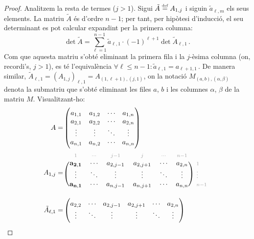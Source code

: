 \begin{s-lema}
\begin{proof}
		Analitzem la resta de termes ($j>1$). Sigui $\tilde{A} \stackrel{\text{\tiny def}}{=} A_{1,j}$ i siguin $\tilde{a}_{\ell,m}$ els seus elements. La matriu $\tilde{A}$ és d'ordre $n-1$; per tant, per hipòtesi d'inducció, el seu determinant es pot calcular expandint per la primera columna: 
		\begin{equation}\label{eq:subdet}
		\det \tilde{A} = \sum_{\ell=1}^{n-1}\tilde{a}_{\ell,1}\cdot (-1)^{\ell+1}\det \tilde{A}_{\ell,1}\,. 
		\end{equation} 
		Com que aquesta matriu s'obté eliminant la primera fila i la $j$-èsima columna (on, recordi's, $j>1$), es té l'equivalència $\forall \ell \le n-1 : {\tilde{a}_{\ell,1} = a_{\ell+1,1}}\,$. De manera similar, $\tilde{A}_{\ell,1} = (A_{1,j})_{\ell,1}= A_{(1,\ell+1),(j,1)}$, on la notació $M_{(a,b),(\alpha,\beta)}$ denota la submatriu que s'obté eliminant les files $a$, $b$ i les columnes $\alpha$, $\beta$ de la matriu $M$. Visualitzant-ho:
		\begin{equation*}
		\begin{split}
		A =&
		\begin{pmatrix}
		a_{1,1}&	a_{1,2}&	\cdots&		a_{1,n}\\
		a_{2,1}&	a_{2,2}&	\cdots&		a_{2,n}\\
		\vdots&		\vdots&		\ddots&		\vdots\\
		a_{n,1}&	a_{n,2}&	\cdots&		a_{n,n}
		\end{pmatrix}\\
		A_{1,j} =&\
		\begin{blockarray}{rcccccc}
		\begin{block}{*{7}{>{\scriptstyle\color[gray]{0.6}}c<{}}}
		1&	\cdots&	 j-1&	j&	\cdots&	n-1 &\\
		\end{block}
		\begin{block}{(cccccc)*{1}{>{\scriptstyle\color[gray]{0.6}}l<{}}}
		\mathbf{a_{2,1}}&\cdots&a_{2,j-1}&a_{2,j+1}&\cdots&		a_{2,n}& 1\\
		\vdots&	   \ddots&	\vdots&	\vdots&	\ddots&		\vdots& \vdots\\
		\mathbf{a_{n,1}}&   \cdots&	a_{n,j-1}&	a_{n,j+1}&	\cdots&		a_{n,n}&	n-1\\
		\end{block}
		\end{blockarray}\\
		\tilde{A}_{\ell,1} =&
		\begin{pmatrix}
		a_{2,2}&\cdots&a_{2,j-1}&a_{2,j+1}&\cdots&		a_{2,n}\\
		\vdots&	\ddots&	   \vdots&	\vdots&	\ddots&	\vdots\\

\end{pmatrix}
\end{split}
\end{equation*}
\end{proof}
\end{s-lema}
